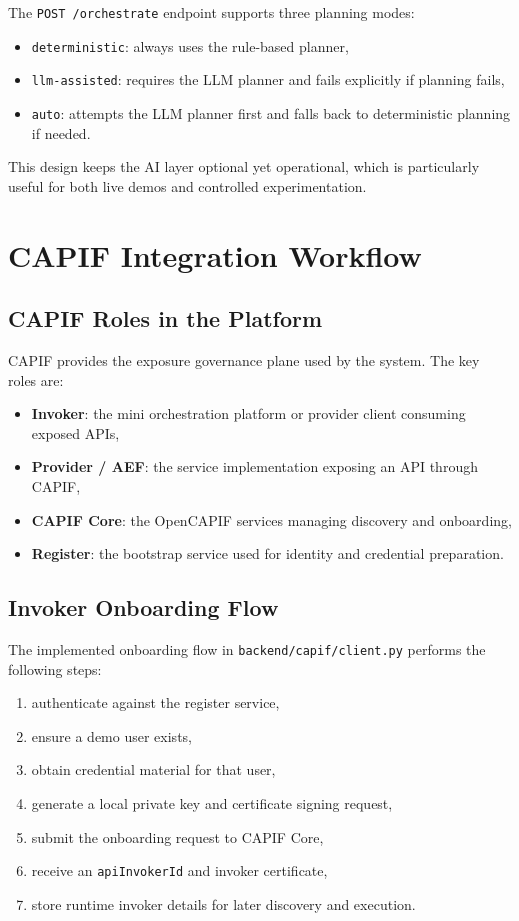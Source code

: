 \documentclass[conference]{IEEEtran}
\begin{document}
The \texttt{POST /orchestrate} endpoint supports three planning modes:

\begin{itemize}[leftmargin=1.1em]
\item \texttt{deterministic}: always uses the rule-based planner,
\item \texttt{llm-assisted}: requires the LLM planner and fails explicitly if planning fails,
\item \texttt{auto}: attempts the LLM planner first and falls back to deterministic planning if needed.
\end{itemize}

This design keeps the AI layer optional yet operational, which is particularly useful for both live demos and controlled experimentation.

\section{CAPIF Integration Workflow}

\subsection{CAPIF Roles in the Platform}

CAPIF provides the exposure governance plane used by the system. The key roles are:

\begin{itemize}[leftmargin=1.1em]
\item \textbf{Invoker}: the mini orchestration platform or provider client consuming exposed APIs,
\item \textbf{Provider / AEF}: the service implementation exposing an API through CAPIF,
\item \textbf{CAPIF Core}: the OpenCAPIF services managing discovery and onboarding,
\item \textbf{Register}: the bootstrap service used for identity and credential preparation.
\end{itemize}

\subsection{Invoker Onboarding Flow}

The implemented onboarding flow in \texttt{backend/capif/client.py} performs the following steps:

\begin{enumerate}[leftmargin=1.1em]
\item authenticate against the register service,
\item ensure a demo user exists,
\item obtain credential material for that user,
\item generate a local private key and certificate signing request,
\item submit the onboarding request to CAPIF Core,
\item receive an \texttt{apiInvokerId} and invoker certificate,
\item store runtime invoker details for later discovery and execution.
\end{enumerate}
\end{document}
